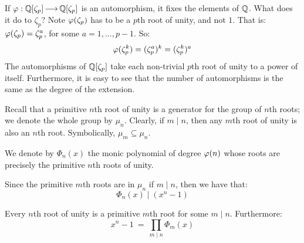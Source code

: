 If $ \operatorname{\varphi}: \mathbb{Q}[\zeta_{p}] \operatorname{\longrightarrow} \mathbb{Q}[\zeta_{p}] $ is an automorphism, it fixes
the elements of $ \mathbb{Q} $. What does it do to $ \zeta_{p} $?
Note $ \operatorname{\varphi}(\zeta_{p}) $ has to be a $ p $th root of unity, and not $ 1 $.
That is: $ \operatorname{\varphi}(\zeta_{p}) = \zeta_{p}^{a} $, for some $ a = 1, \dots, p-1 $.
So:
\begin{equation*}
    \operatorname{\varphi}(\zeta_{p}^{k}) = (\zeta_{p}^{a})^{k} = (\zeta_{p}^{k})^{a}
\end{equation*}
The automorphisms of $ \mathbb{Q}[\zeta_{p}] $ take each non-trivial $ p $th root of
unity to a power of itself. Furthermore, it is easy to see that the number of
automorphisms is the same as the degree of the extension.

Recall that a primitive $ n $th root of unity is a generator for the group of
$ n $th roots; we denote the whole group by $ \mu_{n} $.
Clearly, if $ m \mid n $, then any $ m $th root of unity is also an $ n $th root.
Symbolically, $ \mu_{m} \subseteq \mu_{n} $.

\begin{defn}
    We denote by $ \Phi_{n}(x) $ the monic polynomial of degree $ \operatorname{\varphi}(n) $
    whose roots are precisely the primitive $ n $th roots of unity.
\end{defn}

Since the primitive $ m $th roots are in $ \mu_{n} $ if $ m \mid n $, then we
have that:
\begin{equation*}
    \Phi_{n}(x) \mid (x^{n}-1)
\end{equation*}

\begin{crll}
    Every $ n $th root of unity is a primitive $ m $th root for some
    $ m \mid n $. Furthermore:
    \begin{equation*}
        x^{n}-1 \ = \ \prod_{m\mid n}\Phi_{m}(x)
    \end{equation*}
\end{crll}

